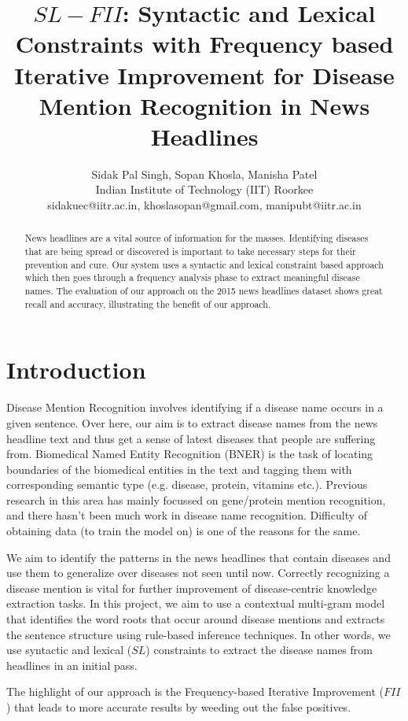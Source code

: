 \documentclass{article}
\title{$SL-FII$: Syntactic and Lexical Constraints with Frequency based Iterative Improvement for Disease Mention Recognition in News Headlines}
\author{Sidak Pal Singh, Sopan Khosla, Manisha Patel \\ 
Indian Institute of Technology (IIT) Roorkee  \\
sidakuec@iitr.ac.in, khoslasopan@gmail.com, manipubt@iitr.ac.in }
\begin{document}
\maketitle

\begin{abstract}
  News headlines are a vital source of information for the masses. Identifying diseases that are being spread or discovered is important to take necessary steps for their prevention and cure. Our system uses a syntactic and lexical constraint based approach which then goes through a frequency analysis phase to extract meaningful disease names. The evaluation of our approach on the 2015 news headlines dataset shows great recall and accuracy, illustrating the benefit of our approach. 
\end{abstract}

\section{Introduction}

Disease Mention Recognition involves identifying if a disease name occurs in a given
sentence. Over here, our aim is to extract disease names from the news headline text
and thus get a sense of latest diseases that people are suffering from. Biomedical Named
Entity Recognition (BNER) is the task of locating boundaries of the biomedical entities in
the text and tagging them with corresponding semantic type (e.g. disease, protein,
vitamins etc.). Previous research in this area has mainly focussed on gene/protein
mention recognition, and there hasn’t been much work in disease name recognition.
Difficulty of obtaining data (to train the model on) is one of the reasons for the same.

We aim to identify the patterns in the news headlines that contain diseases and use them
to generalize over diseases not seen until now. Correctly recognizing a disease mention is vital for further improvement of disease-centric knowledge extraction tasks. In this
project, we aim to use a contextual multi-gram model that identifies the word roots that
occur around disease mentions and extracts the sentence structure using rule-based
inference techniques. In other words, we use syntactic and lexical ($SL$) constraints to extract the disease names from headlines in an initial pass.  

The highlight of our approach is the ​Frequency-based Iterative Improvement ($FII$) that leads to more accurate results by weeding out the false positives.
\end{document}
